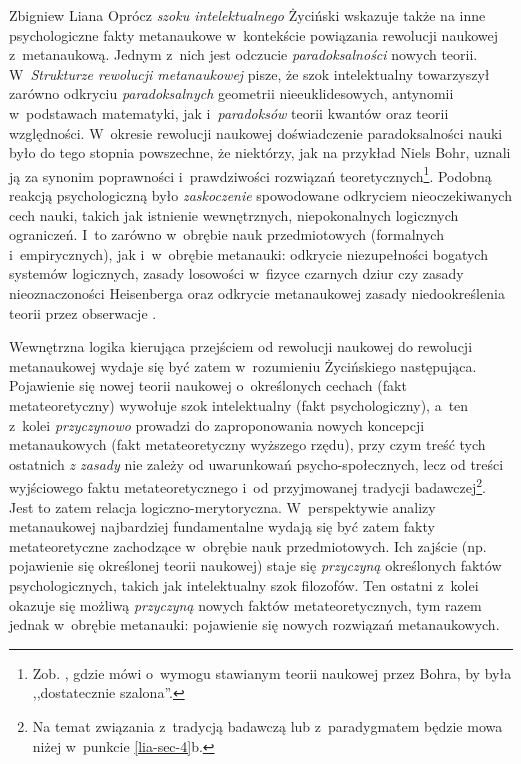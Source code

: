 \begin{artplenv}{Zbigniew Liana}
Oprócz \textit{szoku intelektualnego} Życiński wskazuje także na inne psychologiczne fakty metanaukowe w~kontekście
powiązania rewolucji naukowej z~metanaukową. Jednym z~nich jest odczucie \textit{paradoksalności} nowych teorii. W~\textit{Strukturze
rewolucji metanaukowej} pisze, że szok intelektualny towarzyszył zarówno odkryciu
\textit{paradoksalnych} geometrii nieeuklidesowych, antynomii w~podstawach matematyki, jak i~\textit{paradoksów} teorii
kwantów oraz teorii względności. W~okresie rewolucji naukowej doświadczenie paradoksalności nauki było do tego stopnia
powszechne, że niektórzy, jak na przykład Niels Bohr, uznali ją za synonim poprawności i~prawdziwości rozwiązań
teoretycznych\footnote{Zob.
\parencites[s.~9,132]{zycinski_structure_1988}[s.~16,233]{zycinski_struktura_2013},
gdzie mówi o~wymogu
stawianym teorii naukowej przez Bohra, by była ,,dostatecznie szalona''.}. Podobną reakcją psychologiczną było
\textit{zaskoczenie} spowodowane odkryciem nieoczekiwanych cech nauki, takich jak istnienie wewnętrznych, niepokonalnych
logicznych ograniczeń. I~to zarówno w~obrębie nauk przedmiotowych (formalnych i~empirycznych), jak i~w~obrębie
metanauki: odkrycie niezupełności bogatych systemów logicznych, zasady losowości w~fizyce czarnych dziur czy zasady
nieoznaczoności Heisenberga oraz odkrycie metanaukowej zasady niedookreślenia teorii przez obserwacje
\parencites[s.~11]{zycinski_structure_1988}[s.~20]{zycinski_struktura_2013}.

Wewnętrzna logika kierująca przejściem od rewolucji naukowej do rewolucji metanaukowej wydaje się być zatem w~rozumieniu
Życińskiego następująca. Pojawienie się nowej teorii naukowej o~określonych cechach (fakt metateoretyczny) wywołuje
szok intelektualny (fakt psychologiczny), a~ten z~kolei \textit{przyczynowo} prowadzi do zaproponowania nowych koncepcji
metanaukowych (fakt metateoretyczny wyższego rzędu), przy czym treść tych ostatnich \textit{z zasady }nie zależy od
uwarunkowań psycho-społecznych, lecz od treści wyjściowego faktu metateoretycznego i~od przyjmowanej tradycji
badawczej\footnote{Na temat związania z~tradycją badawczą lub z~paradygmatem będzie mowa niżej w~punkcie \ref{lia-sec-4}b.}. Jest to
zatem relacja logiczno-merytoryczna. W~perspektywie analizy metanaukowej najbardziej fundamentalne wydają się być zatem
fakty metateoretyczne zachodzące w~obrębie nauk przedmiotowych. Ich zajście (np. pojawienie się określonej teorii
naukowej) staje się \textit{przyczyną} określonych faktów psychologicznych, takich jak intelektualny szok filozofów. Ten
ostatni z~kolei okazuje się możliwą \textit{przyczyną} nowych faktów metateoretycznych, tym razem jednak w~obrębie
metanauki: pojawienie się nowych rozwiązań metanaukowych.


\end{artplenv}
